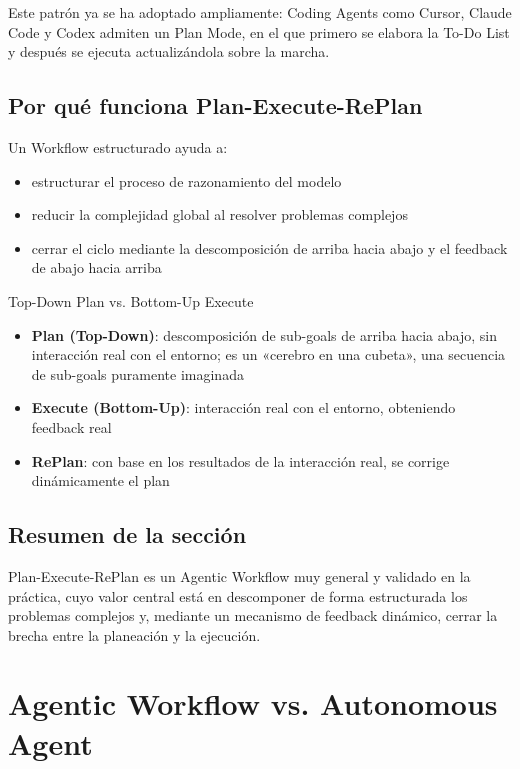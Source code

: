 \documentclass[a4paper]{article}
\begin{document}
Este patrón ya se ha adoptado ampliamente: Coding Agents como Cursor, Claude Code y Codex admiten un Plan Mode, en el que primero se elabora la To-Do List y después se ejecuta actualizándola sobre la marcha.

\subsection{Por qué funciona Plan-Execute-RePlan}

Un Workflow estructurado ayuda a:
\begin{itemize}
    \item estructurar el proceso de razonamiento del modelo
    \item reducir la complejidad global al resolver problemas complejos
    \item cerrar el ciclo mediante la descomposición de arriba hacia abajo y el feedback de abajo hacia arriba
\end{itemize}

\begin{knowledgebox}{Top-Down Plan vs. Bottom-Up Execute}
\begin{itemize}
    \item \textbf{Plan (Top-Down)}: descomposición de sub-goals de arriba hacia abajo, sin interacción real con el entorno; es un «cerebro en una cubeta», una secuencia de sub-goals puramente imaginada
    \item \textbf{Execute (Bottom-Up)}: interacción real con el entorno, obteniendo feedback real
    \item \textbf{RePlan}: con base en los resultados de la interacción real, se corrige dinámicamente el plan
\end{itemize}
\end{knowledgebox}

\subsection{Resumen de la sección}

Plan-Execute-RePlan es un Agentic Workflow muy general y validado en la práctica, cuyo valor central está en descomponer de forma estructurada los problemas complejos y, mediante un mecanismo de feedback dinámico, cerrar la brecha entre la planeación y la ejecución.
\section{Agentic Workflow vs. Autonomous Agent}
\end{document}
